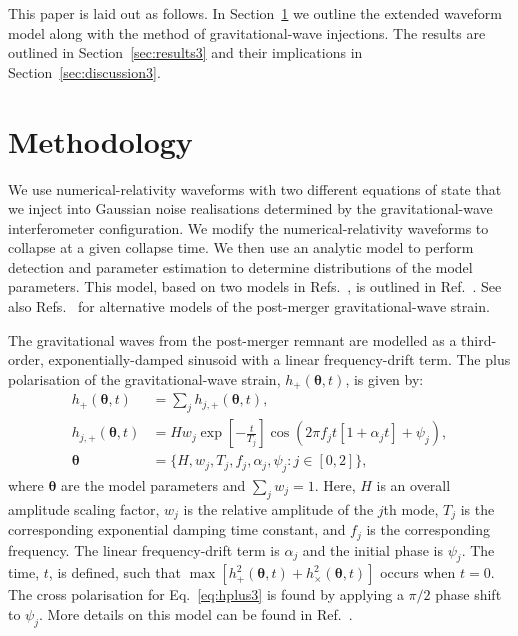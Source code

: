 \documentclass[../Thesis.tex]{subfiles}
\begin{document}
    This paper is laid out as follows. In Section~\ref{sec:methodology3} we outline the extended waveform model along with the method of gravitational-wave injections.
    The results are outlined in Section~\ref{sec:results3} and their implications in Section~\ref{sec:discussion3}.
 
    \vspace{-0.25cm}
    \section{Methodology}\label{sec:methodology3}
    We use numerical-relativity waveforms with two different equations of state that we inject into Gaussian noise realisations determined by the gravitational-wave interferometer configuration.
    We modify the numerical-relativity waveforms to collapse at a given collapse time.
    We then use an analytic model to perform detection and parameter estimation to determine distributions of the model parameters.
    This model, based on two models in Refs.~\cite{Bauswein2016,Bose2018}, is outlined in Ref.~\cite{Easter2020}.
    See also Refs.~\cite{Tsang2019,Breschi2019} for alternative models of the post-merger gravitational-wave strain.
 
    
    

        The gravitational waves from the post-merger remnant are modelled as a third-order, exponentially-damped sinusoid with a linear frequency-drift term. The plus polarisation of the gravitational-wave strain, $h_{+}(\boldsymbol{\theta},t)$, is given by: 
\begin{align}
        h_{+}(\boldsymbol{\theta},t) & = \sum_{j} h_{j,+}(\boldsymbol{\theta},t),\nonumber\\
        h_{j,+}(\boldsymbol{\theta},t) & = 
        H w_j \exp\left[-\frac{t}{T_j}\right] \cos \left(2\pi f_j t\left[1+\alpha_j t\right]+\psi_j \right),\nonumber\\
        \boldsymbol{\theta} & = \{H,w_j,T_j,f_j,\alpha_j,\psi_j :  j \in [0,2] \},\label{eq:hplus3}
\end{align}
    where $\boldsymbol{\theta}$ are the model parameters and $\sum_{j} w_j=1$. 
    Here, $H$ is an overall amplitude scaling factor, $w_j$ is the relative amplitude of the $j$th mode, $T_j$ is the corresponding exponential damping time constant, and $f_j$ is the corresponding frequency.
    The linear frequency-drift term is $\alpha_j$ and the initial phase  is $\psi_j$.
    The time, $t$, is defined, such that $\max\left[h_+^2(\boldsymbol{\theta},t)+h_\times^2(\boldsymbol{\theta},t)\right]$ occurs when $t=0$. 
    The cross polarisation for Eq.~\ref{eq:hplus3} is found by applying a $\pi/2$ phase shift to $\psi_j$.
    More details on this model can be found in Ref.~\cite{Easter2020}.
    
\end{document}
